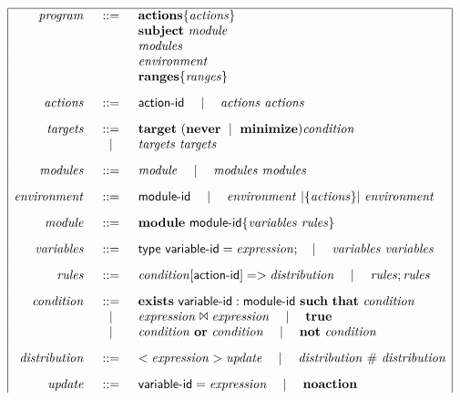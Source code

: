 \begin{table} %
	$$
	\begin{array}{|rcl|}
	\hline
	\mathit{program} &::=& \mathbf{actions} \{ \mathit{actions} \} \\
		&& \mathbf{subject} \Space \mathit{module} \\
		&& \mathit{modules} \\
		&& \mathit{environment} \\
		&& \mathbf{ranges} \{ \mathit{ranges} \}
		\\[.3cm]
	\mathit{actions} &::=& \x{action}\textrm{-}\x{id} \Sep \mathit{actions} \Space \mathit{actions}
		\\[.3cm]
	\mathit{targets} &::=& \mathbf{target} \Space (\mathbf{never} \sep \mathbf{minimize}) \mathit{condition}  \\
		& \Sep & \mathit{targets} \Space \mathit{targets}
		\\[.3cm]
	\mathit{modules} &::=& \mathit{module} \Sep \mathit{modules} \Space \mathit{modules}
		\\[.3cm]
	\mathit{environment} &::=& \x{module}\textrm{-}\x{id} \Sep \mathit{environment} \Par{\{\mathit{actions}\}} \mathit{environment}
		\\[.3cm]
	\mathit{module} &::=& \mathbf{module} \Space \x{module}\textrm{-}\x{id} \{ \mathit{variables} \Space \mathit{rules} \}
		\\[.3cm]
	\mathit{variables} &::=& \x{type} \Space \x{variable}\textrm{-}\x{id} = \mathit{expression}; \Sep \mathit{variables} \Space \mathit{variables}
		\\[.3cm]
	\mathit{rules} &::=& \mathit{condition} [ \x{action}\textrm{-}\x{id}] => \mathit{distribution} \Sep \mathit{rules};\mathit{rules}
		\\[.3cm]
	\mathit{condition} &::=& \mathbf{exists} \Space \x{variable}\textrm{-}\x{id}:\x{module}\textrm{-}\x{id} \Space \mathbf{such}\Space\mathbf{that} \Space \mathit{condition} \\
		& \Sep & \mathit{expression} \Join \mathit{expression} \Sep \mathbf{true} \\
		& \Sep & \mathit{condition} \Space \mathbf{or} \Space \mathit{condition} \Sep \mathbf{not} \Space \mathit{condition}
		\\[.3cm]
	\mathit{distribution} &::=& <\mathit{expression}> \mathit{update} \Sep \mathit{distribution} \Space \# \Space \mathit{distribution}
		\\[.3cm]
	\mathit{update} &::=& \x{variable}\textrm{-}\x{id} = \mathit{expression} \Sep \mathbf{noaction} \\

\end{array}$$
\end{table}
